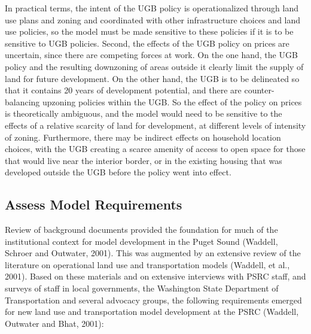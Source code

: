 In practical terms, the intent of the UGB policy is operationalized through land use plans and zoning and coordinated with other infrastructure choices and land use policies, so the model must be made sensitive to these policies if it is to be sensitive to UGB policies.  Second, the effects of the UGB policy on prices are uncertain, since there are competing forces at work.  On the one hand, the UGB policy and the resulting downzoning of areas outside it clearly limit the supply of land for future development.  On the other hand, the UGB is to be delineated so that it contains 20 years of development potential, and there are counter-balancing upzoning policies within the UGB.  So the effect of the policy on prices is theoretically ambiguous, and the model would need to be sensitive to the effects of a relative scarcity of land for development, at different levels of intensity of zoning.  Furthermore, there may be indirect effects on household location choices, with the UGB creating a scarce amenity of access to open space for those that would live near the interior border, or in the existing housing that was developed outside the UGB before the policy went into effect.

\subsection{Assess Model Requirements}

Review of background documents provided the foundation for much of the institutional context for model development in the Puget Sound (Waddell, Schroer and Outwater, 2001).  This was augmented by an extensive review of the literature on operational land use and transportation models (Waddell, et al., 2001).  Based on these materials and on extensive interviews with PSRC staff, and surveys of staff in local governments, the Washington State Department of Transportation and several
advocacy groups, the following requirements emerged for new land use and transportation model development at the PSRC (Waddell, Outwater and Bhat, 2001):


